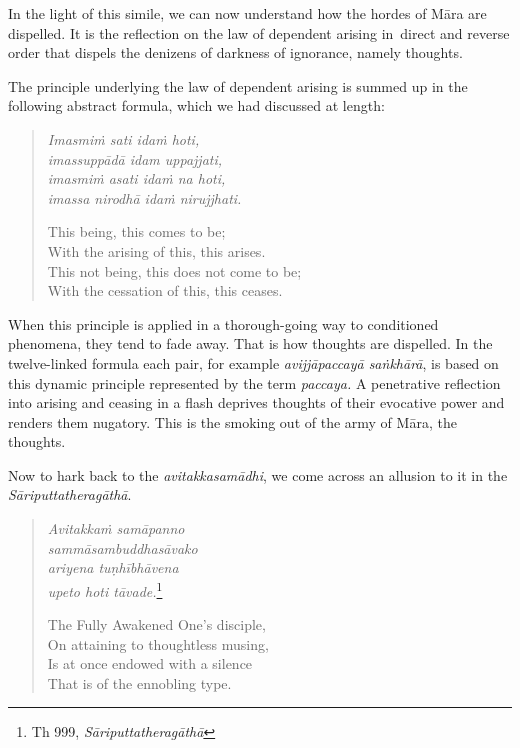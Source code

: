 In the light of this simile, we can now understand how the hordes of Māra are dispelled. It is the reflection on the law of dependent arising in~direct and reverse order that dispels the denizens of darkness of ignorance, namely thoughts.

The principle underlying the law of dependent arising is summed up in the following abstract formula, which we had discussed at length:

\begin{quote}
\emph{Imasmiṁ sati idaṁ hoti,}\\
\emph{imassuppādā idam uppajjati,}\\
\emph{imasmiṁ asati idaṁ na hoti,}\\
\emph{imassa nirodhā idaṁ nirujjhati.}

This being, this comes to be;\\
With the arising of this, this arises.\\
This not being, this does not come to be;\\
With the cessation of this, this ceases.
\end{quote}

When this principle is applied in a thorough-going way to conditioned phenomena, they tend to fade away. That is how thoughts are dispelled. In the twelve-linked formula each pair, for example \emph{avijjāpaccayā saṅkhārā}, is based on this dynamic principle represented by the term \emph{paccaya.} A penetrative reflection into arising and ceasing in a flash deprives thoughts of their evocative power and renders them nugatory. This is the smoking out of the army of Māra, the thoughts.

Now to hark back to the \emph{avitakkasamādhi}, we come across an allusion to it in the \emph{Sāriputtatheragāthā}.

\begin{quote}
\emph{Avitakkaṁ samāpanno}\\
\emph{sammāsambuddhasāvako}\\
\emph{ariyena tuṇhībhāvena}\\
\emph{upeto hoti tāvade.}\footnote{Th 999, \emph{Sāriputtatheragāthā}}

The Fully Awakened One's disciple,\\
On attaining to thoughtless musing,\\
Is at once endowed with a silence\\
That is of the ennobling type.
\end{quote}

